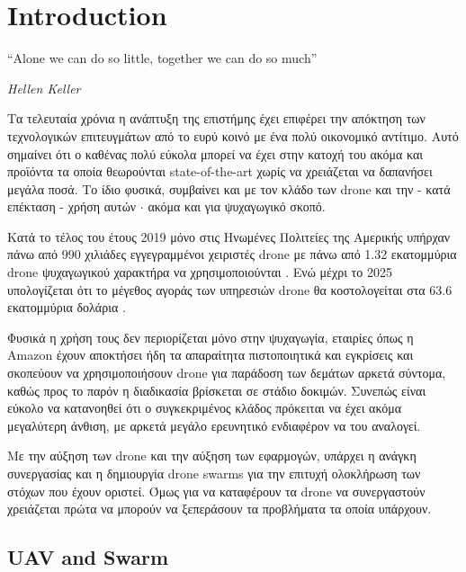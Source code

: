 \chapter{Introduction} %
\label{chap:Chapter1}  %
\epigraph{``Alone we can do so little, together we can do so much” }{\textit{Hellen Keller}}

Τα τελευταία χρόνια η ανάπτυξη της επιστήμης έχει επιφέρει την απόκτηση των 
τεχνολογικών επιτευγμάτων από το ευρύ κοινό με ένα πολύ οικονομικό αντίτιμο. Αυτό σημαίνει
ότι ο καθένας πολύ εύκολα μπορεί να έχει στην κατοχή του ακόμα και προϊόντα τα οποία θεωρούνται 
state-of-the-art χωρίς να χρειάζεται να δαπανήσει μεγάλα ποσά. 
Το ίδιο φυσικά, συμβαίνει και με τον κλάδο των drone και την - κατά επέκταση - χρήση αυτών $\cdot$ ακόμα και 
για ψυχαγωγικό σκοπό.  
\par
Κατά το τέλος του έτους 2019 μόνο στις Ηνωμένες Πολιτείες της Αμερικής υπήρχαν πάνω από 
990 χιλιάδες εγγεγραμμένοι χειριστές drone με πάνω από 1.32 εκατομμύρια drone ψυχαγωγικού 
χαρακτήρα να χρησιμοποιούνται \cite{2019-drone-statistic}. Ενώ μέχρι το 2025 υπολογίζεται 
ότι το μέγεθος αγοράς των υπηρεσιών drone θα κοστολογείται στα 63.6 εκατομμύρια δολάρια \cite{expected-drone-market}.
\par
Φυσικά η χρήση τους δεν περιορίζεται μόνο στην ψυχαγωγία, εταιρίες όπως η Amazon έχουν 
αποκτήσει ήδη τα απαραίτητα πιστοποιητικά και εγκρίσεις και σκοπεύουν να 
χρησιμοποιήσουν drone για παράδοση των δεμάτων \cite{amazon-drones} αρκετά σύντομα, καθώς προς το παρόν
η διαδικασία βρίσκεται σε στάδιο δοκιμών. 
Συνεπώς είναι εύκολο να κατανοηθεί ότι ο συγκεκριμένος κλάδος πρόκειται να έχει ακόμα μεγαλύτερη 
άνθιση, με αρκετά μεγάλο ερευνητικό ενδιαφέρον να του αναλογεί.   
\par
Με την αύξηση των drone και την αύξηση των εφαρμογών, υπάρχει η ανάγκη συνεργασίας και η δημιουργία drone swarms 
για την επιτυχή ολοκλήρωση των στόχων που έχουν οριστεί. Όμως για να καταφέρουν τα drone
να συνεργαστούν χρειάζεται πρώτα να μπορούν να ξεπεράσουν τα προβλήματα τα οποία υπάρχουν.

\newpage

\section{UAV and Swarm} \label{sec:Chapter1-1} 

